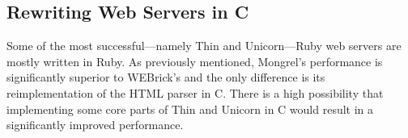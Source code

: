 \subsection{Rewriting Web Servers in C}
Some of the most successful---namely Thin and Unicorn---Ruby web servers are mostly written in Ruby. As previously mentioned, Mongrel's performance is significantly superior to WEBrick's and the only difference is its reimplementation of the HTML parser in C. There is a high possibility that implementing some core parts of Thin and Unicorn in C would result in a significantly improved performance.

\begin{comment}
This is deprecated!!!!!!

The existing research provides a solid base for future work on this subject. The endured technology overview allowed the creation of an expectancy base for each component. The state of the art provided an overview of the current engaged work on related, if not similar, subjects.

All the gathered and structured information permitted option narrowing when it comes to future work. Taking into account the research and conclusions of some related work, some components will be left out of future benchmarking, tuning, testing and improvement.

On the Operating System's concern, Microsoft's operating system will be left out of future efforts since its Ruby and Rails support is significantly poor and inefficient. The lack of benchmark and testing information about BSD and the fact that its performance should be similar to Linux's include it in the test group. Concluding, the Operating Systems contempt by this project will be Linux and BSD.

Ruby is currently in version 1.9 which has many improvements over the previous version, both performance and not performance-oriented. Since YARV is the only one to support its specification to full extent, this will be the only interpreter targeted for improvements. Luckily, Rubinius' 1.9 support is growing day by day and it is close to 100\%. Only time will tell if this interpreter will be considered as well.

Rails web servers' situation is more flat. Only WEBrick is left out for obvious reasons --- it was Rails' pioneer web server but lacks the efficiency to compete with nowadays alternatives.

When it comes to relational databases, MySQL's scaling and performance capabilities shine. On the other hand, MongoDB presents itself as a worthy alternative but it has an important characteristic --- it is a schema-less database. PostgreSQL, although providing many interesting features, is not efficient enough to compete with MySQL, being left out of the test group for further work. MySQL and MongoDB are targeted for all the aforementioned improvement cycle.


\end{comment}
